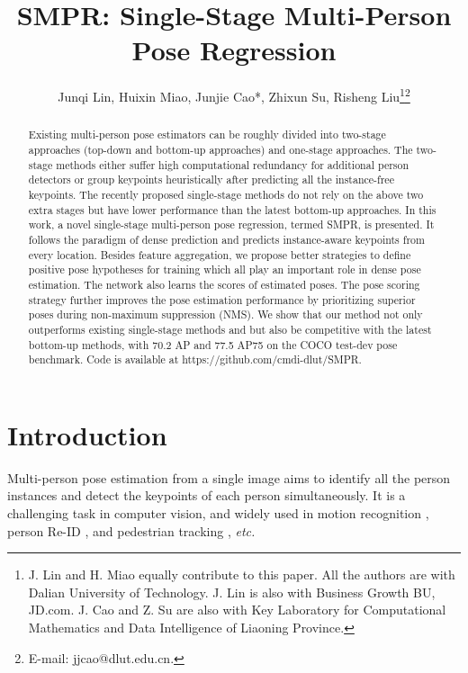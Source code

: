 \documentclass[11pt,twocolumn,journal]{IEEEtran}
\newcommand{\etc}{\emph{etc.} }
\newcommand{\SMPR}{SMPR}
\begin{document}
\title{\SMPR: Single-Stage Multi-Person Pose Regression}






\author{Junqi Lin, Huixin Miao, Junjie Cao*, Zhixun Su, Risheng Liu\thanks{J. Lin and H. Miao equally contribute to this paper. All the authors are with Dalian University of Technology. 
J. Lin is also with Business Growth BU, JD.com. 
J. Cao and Z. Su are also with Key Laboratory for Computational Mathematics and Data Intelligence of Liaoning Province.}\thanks{E-mail: jjcao@dlut.edu.cn.}}



\maketitle


\begin{abstract}
Existing multi-person pose estimators can be roughly divided into two-stage approaches (top-down and bottom-up approaches) and one-stage approaches. The two-stage methods either suffer high computational redundancy for additional person detectors or group keypoints heuristically after predicting all the instance-free keypoints. The recently proposed single-stage methods do not rely on the above two extra stages but have lower performance than the latest bottom-up approaches. In this work, a novel single-stage multi-person pose regression, termed \SMPR, is presented. It follows the paradigm of dense prediction and predicts instance-aware keypoints from every location. Besides feature aggregation, we propose better strategies to define positive pose hypotheses for training which all play an important role in dense pose estimation. The network also learns the scores of estimated poses. The pose scoring strategy further improves the pose estimation performance by prioritizing superior poses during non-maximum suppression (NMS). We show that our method not only outperforms existing single-stage methods and but also be competitive with the latest bottom-up methods, with 70.2 AP and 77.5 AP75 on the COCO test-dev pose benchmark. Code is available at https://github.com/cmdi-dlut/SMPR.





\end{abstract}

\section{Introduction}
Multi-person pose estimation from a single image aims to identify all the person instances and detect the keypoints of each person simultaneously. It is a challenging task in computer vision, and widely used in motion recognition \cite{wang2018rgb, wang2013approach}, person Re-ID \cite{li2018harmonious}, and pedestrian tracking \cite{zhu2013apt}, \etc
\end{document}
